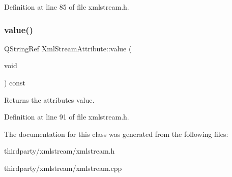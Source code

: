 Definition at line 85 of file xmlstream.\+h.

\mbox{\label{class_xml_stream_attribute_a0cd7ec6aa7531c411ed20a354c2e7f24}} 
\subsubsection{\texorpdfstring{value()}{value()}}
{\footnotesize\ttfamily Q\+String\+Ref Xml\+Stream\+Attribute\+::value (\begin{DoxyParamCaption}\item[{void}]{ }\end{DoxyParamCaption}) const\hspace{0.3cm}{\ttfamily [inline]}}

Returns the attribute\textquotesingle{}s value. 

Definition at line 91 of file xmlstream.\+h.



The documentation for this class was generated from the following files\+:\begin{DoxyCompactItemize}
\item 
thirdparty/xmlstream/xmlstream.\+h\item 
thirdparty/xmlstream/xmlstream.\+cpp\end{DoxyCompactItemize}
